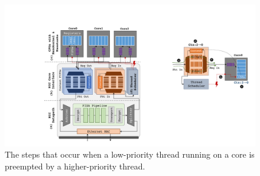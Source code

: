 \begin{figure}
  \includegraphics[width=0.8\linewidth]{./figures/thread-sched}
  \caption{The steps that occur when a low-priority thread running on a core is preempted by a higher-priority thread.}
  \label{fig:nic-scheduler}
\end{figure}

